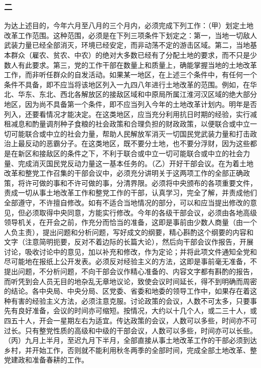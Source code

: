 \documentclass[cn,11pt,chinese]{elegantbook}
\def\myformat#1{\hfil\hfil #1}
\begin{document}
\subsubsection*{\myformat{二}}
为达上述目的，今年六月至八月的三个月内，必须完成下列工作：（甲）划定土地改革工作范围。这种范围，必须是在下列三项条件下划定之：第一，当地一切敌人武装力量已经全部消灭，环境已经安定，而非动荡不定的游击区域。第二，当地基本群众（雇农、贫农、中农）的绝对大多数已经有了分配土地的要求，而不只是少数人有此要求。第三，党的工作干部在数量上和质量上，确能掌握当地的土地改革工作，而非听任群众的自发活动。如果某一地区，在上述三个条件中，有任何一个条件不具备，即不应当将该地区列入一九四八年进行土地改革的范围。例如，在华北、华东、东北、西北各解放区的接敌区域和中原局所属江淮河汉区域的绝大部分地区，因为尚不具备第一个条件，即不应当列入今年的土地改革计划内。明年是否列入，还要看情况才能决定。在这类地区，应当充分利用抗日时期的经验，实行减租减息和酌量调剂种子食粮的社会政策和合理负担的财政政策，以便联合或中立一切可能联合或中立的社会力量，帮助人民解放军消灭一切国民党武装力量和打击政治上最反动的恶霸分子。在这类地区，既不要分土地，也不要分浮财，因为这些都是在新区和接敌区的条件之下，不利于联合或中立一切可能联合或中立的社会力量、完成消灭国民党反动力量这一基本任务的。（乙）开好干部会议。在为着土地改革和整党工作召集的干部会议中，必须充分讲明关于这两项工作的全部正确政策，将许可做的事和不许可做的事，分清界限。必须将中央颁布的各项重要文件，责成一切从事土地改革工作和整党工作的干部，认真学习，完全了解，并责成他们全部遵守，不许擅自修改。如有不适合当地情况的部分，可以和应当提出修改的意见，但必须取得中央同意，方能实行修改。今年的各级干部会议，必须由各地高级领导机关，在开会之前，作充分而恰当的准备，这即是事前由少数人商量（由一个人负主责），提出问题和分析问题，写好成文的纲要，精心斟酌这个纲要的内容和文字（注意简明扼要，反对不着边际的长篇大论），然后向干部会议作报告，开展讨论，吸收讨论中的意见，加以补充和修改，作为定论；并将此项文件通知全党和尽可能地在报纸上公开发表。必须反对经验主义的方法，这即是事前毫无准备，不提出问题，不分析问题，不向干部会议作精心准备的、内容文字都有斟酌的报告，而听凭到会人员无目的地杂乱无章地议论，致使会议时间延长，得不到明确而周密的结论。各中央局、中央分局、区党委、省委和地委的领导工作中，如果存在着这种有害的经验主义方法，必须注意克服。讨论政策的会议，人数不可太多，只要事先有良好准备，会议的时间亦可缩短。按情况，大约以十几个人，或二三十人，或四五十人，开会一星期左右为适宜。传达政策的会议，人数可以多些，时间亦不可过长。只有整党性质的高级和中级的干部会议，人数可以多些，时间亦可以长些。（丙）九月上半月，至迟九月下半月，全部直接从事土地改革工作的干部必须到达乡村，并开始工作，否则就不能利用秋冬两季的全部时间，完成全部土地改革、整党建政和准备春耕的工作。\\
\end{document}
